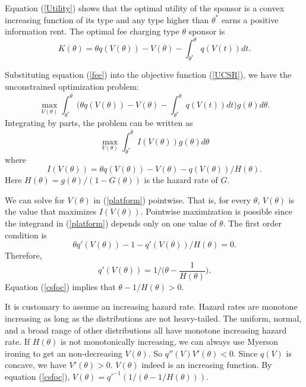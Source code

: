 \documentclass[12pt]{article}
\begin{document}
Equation (\ref{Utility}) shows that the optimal utility of the sponsor
is a convex increasing function of its type and any type higher than
$\theta^{*}$ earns a positive information rent. The optimal fee charging
type $\theta$ sponsor is
\begin{equation}
K(\theta)=\theta q(V(\theta))-V(\theta)-\int_{\theta^{*}}^{\theta}q(V(t))dt.\label{fee}
\end{equation}

Substituting equation (\ref{fee}) into the objective function (\ref{UCSR}),
we have the unconstrained optimization problem:
\begin{equation}
\max_{V(\theta)}\int_{\theta^{*}}^{\overline{\theta}}\Big(\theta q(V(\theta))-V(\theta)-\int_{\theta^{*}}^{\theta}q(V(t))dt\Big)g(\theta)d\theta.
\end{equation}
Integrating by parts, the problem can be written as
\begin{equation}
\max_{V(\theta)}\int_{\theta^{*}}^{\overline{\theta}}I(V(\theta))g(\theta)d\theta\label{platform}
\end{equation}
where
\begin{equation}
I(V(\theta))=\theta q(V(\theta))-V(\theta)-q(V(\theta))/H(\theta).
\end{equation}
Here $H(\theta)=g(\theta)/(1-G(\theta))$ is the hazard rate of $G$.

We can solve for $V(\theta)$ in (\ref{platform}) pointwise.
That is, for every $\theta$, $V(\theta)$ is the value that maximizes
$I(V(\theta))$. Pointwise maximization is possible since the integrand
in (\ref{platform}) depends only on one value of $\theta$. The
first order condition is
\begin{equation}
\theta q'(V(\theta))-1-q'(V(\theta))/H(\theta)=0.
\end{equation}
Therefore,
\begin{equation}
q'(V(\theta))=1\Big/\Big(\theta-\frac{1}{H(\theta)}\Big).\label{csfoc}
\end{equation}
Equation (\ref{csfoc}) implies that $\theta-1/H(\theta)>0$.

It is customary to assume an increasing hazard rate. Hazard rates
are monotone increasing as long as the distributions are not heavy-tailed.
The uniform, normal, and a broad range of other distributions all
have monotone increasing hazard rate. If $H(\theta)$ is not monotonically
increasing, we can always use Myerson ironing \citep{Baron:1982, Guesnerie:1984}
to get an non-decreasing $V(\theta)$. So $q''(V)V'(\theta)<0$. Since
$q(V)$ is concave, we have $V'(\theta)>0$. $V(\theta)$ indeed is
an increasing function. By equation (\ref{csfoc}), $V(\theta)=q'^{-1}(1/(\theta-1/H(\theta)))$.
\end{document}
